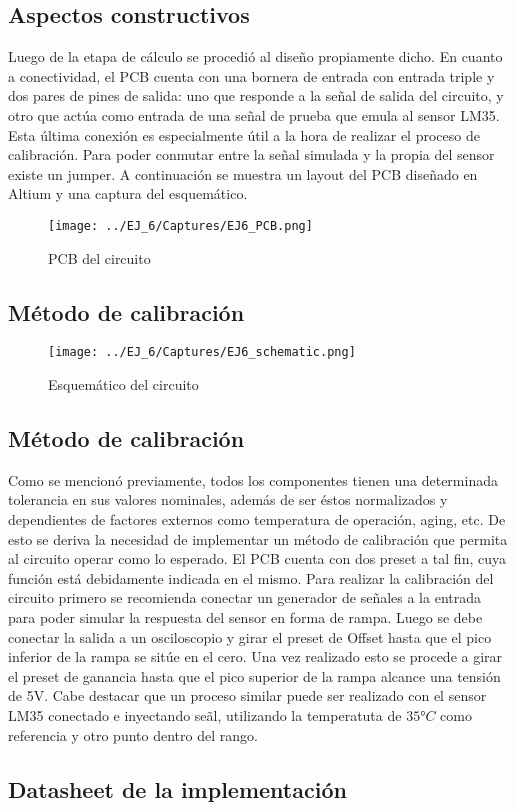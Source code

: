  \subsection{Aspectos constructivos}

 Luego de la etapa de c\'alculo se procedi\'o al dise\~no propiamente dicho. En cuanto a conectividad, el PCB cuenta con una bornera de entrada con entrada triple y dos pares de pines de salida: uno que responde a la señal de salida del circuito, y otro que actúa como entrada de una señal de prueba que emula al sensor LM35.
  Esta \'ultima conexi\'on es especialmente \'util a la hora de realizar el proceso de calibraci\'on. Para poder conmutar entre la se\~nal simulada y la propia del sensor existe un jumper. A continuaci\'on se muestra un layout del PCB diseñado en Altium y una captura del esquem\'atico.
 
  \begin{figure}[H]
    \centering
    \texttt{[image: ../EJ\_6/Captures/EJ6\_PCB.png]}
    \caption{PCB del circuito}
    \label{fig:EJ6_PCB} 
\end{figure}
 \subsection{M\'etodo de calibraci\'on}

 \begin{figure}[H]
    \centering
    \texttt{[image: ../EJ\_6/Captures/EJ6\_schematic.png]}
    \caption{Esquem\'atico del circuito}
    \label{fig:EJ6_schematic} 
\end{figure}

 \subsection{M\'etodo de calibraci\'on}

 Como se mencion\'o previamente, todos los componentes tienen una determinada tolerancia en sus valores nominales, adem\'as de ser \'estos normalizados y dependientes de factores externos como temperatura de operaci\'on, aging, etc.
  De esto se deriva la necesidad de implementar un m\'etodo de calibraci\'on que permita al circuito operar como lo esperado. El PCB cuenta con dos preset a tal fin, cuya funci\'on est\'a debidamente indicada en el mismo.
  Para realizar la calibraci\'on del circuito primero se recomienda conectar un generador de señales a la entrada para poder simular la respuesta del sensor en forma de rampa.
 Luego se debe conectar la salida a un osciloscopio y girar el preset de Offset hasta que el pico inferior de la rampa se sit\'ue en el cero. Una vez realizado esto se procede a girar el preset de ganancia hasta que el pico superior de la rampa alcance una tensi\'on de 5V.
  Cabe destacar que un proceso similar puede ser realizado con el sensor LM35 conectado e inyectando se\~al, utilizando la temperatuta de $35°C$ como referencia y otro punto dentro del rango.

  \subsection{Datasheet de la implementaci\'on}